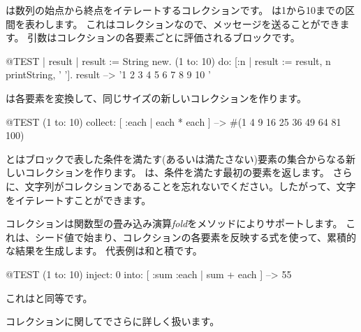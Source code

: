 \documentclass[a4paper,10pt,twoside]{book}
\begin{document}
は数列の始点から終点をイテレートするコレクションです。
は1から10までの区間を表わします。
これはコレクションなので、メッセージを送ることができます。
引数はコレクションの各要素ごとに評価されるブロックです。

\begin{code}{@TEST | result |}
result := String new.
(1 to: 10) do: [:n | result := result, n printString, ' '].
result --> '1 2 3 4 5 6 7 8 9 10 '
\end{code}


は各要素を変換して、同じサイズの新しいコレクションを作ります。
\begin{code}{@TEST}
(1 to: 10) collect: [ :each | each * each ] --> #(1 4 9 16 25 36 49 64 81 100)
\end{code}

とはブロックで表した条件を満たす(あるいは満たさない)要素の集合からなる新しいコレクションを作ります。
は、条件を満たす最初の要素を返します。
さらに、文字列がコレクションであることを忘れないでください。したがって、文字をイテレートすことができます。


コレクションは関数型の畳み込み演算\emph{fold}をメソッドによりサポートします。
これは、シード値で始まり、コレクションの各要素を反映する式を使って、累積的な結果を生成します。
代表例は和と積です。

\begin{code}{@TEST}
(1 to: 10) inject: 0 into: [ :sum :each | sum + each ] --> 55
\end{code}

\noindent
これはと同等です。

コレクションに関してでさらに詳しく扱います。

\end{document}
